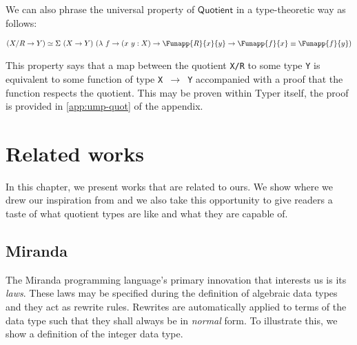 \documentclass[12pt,twoside,maitrise]{dms}
\theoremstyle{definition}
\numberwithin{equation}{section}
\numberwithin{table}{chapter}
\numberwithin{figure}{chapter}
\newcommand\kw[1] {\textsf{#1}}
\newcommand\id[1] {\texttt{#1}}
\newcommand\fn[1] {\texttt{#1}}
\begin{document}
We can also phrase the universal property of $\kw{Quotient}$ in a type-theoretic
way as follows:

\begin{align*}
  & (X/R \rightarrow Y) \simeq \Sigma \ (X \rightarrow Y) \ (\lambda \ f \rightarrow (x \ y : X) \rightarrow \Funapp{R}{x}{y} \rightarrow \Funapp{f}{x} \equiv \Funapp{f}{y}) \\
\end{align*}

This property says that a map between the quotient \fn{X/R} to some type \id{Y}
is equivalent to some function of type \fn{X $\rightarrow$ Y} accompanied with a
proof that the function respects the quotient. This may be proven within Typer
itself, the proof is provided in \autoref{app:ump-quot} of the appendix.

\chapter{Related works}



In this chapter, we present works that are related to ours. We show where we
drew our inspiration from and we also take this opportunity to give readers a
taste of what quotient types are like and what they are capable of.

\section{Miranda}

The Miranda programming language's\cite{thompson1986laws, thompson1990lawful}
primary innovation that interests us is its \emph{laws}. These laws may be
specified during the definition of algebraic data types and they act as rewrite
rules. Rewrites are automatically applied to terms of the data type such that
they shall always be in \emph{normal} form. To illustrate this, we show a
definition of the integer data type.
\end{document}
